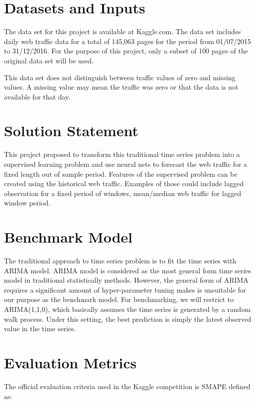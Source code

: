 \documentclass[10pt, a4paper]{article}
\begin{document}
\section{Datasets and Inputs}
The data set for this project is available at Kaggle.com. The data set includes daily web traffic data for a total of 145,063 pages for the period from 01/07/2015 to 31/12/2016. For the purpose of this project, only a subset of 100 pages of the original data set will be used.

This data set does not distinguish between traffic values of zero and missing values. A missing value may mean the traffic was zero or that the data is not available for that day.



\section{Solution Statement}
This project proposed to transform this traditional time series problem into a supervised learning problem and use neural nets to forecast the web traffic for a fixed length out of sample period.
Features of the supervised problem can be created using the historical web traffic. Examples of those could include lagged observation for a fixed period of windows, mean/median web traffic for lagged window period.



\section{Benchmark Model}

The traditional approach to time series problem is to fit the time series with ARIMA model. ARIMA model is considered as the most general form time series model in traditional statistically methods. However, the general form of ARIMA requires a significant amount of hyper-parameter tuning makes is unsuitable for our purpose as the benchmark model.
For benchmarking, we will restrict to ARIMA(1,1,0), which basically assumes the time series is generated by a random walk process. Under this setting, the best prediction is simply the latest observed value in the time series.

\section{Evaluation Metrics}

The official evaluation criteria used in the Kaggle competition is SMAPE defined as:
\end{document}
